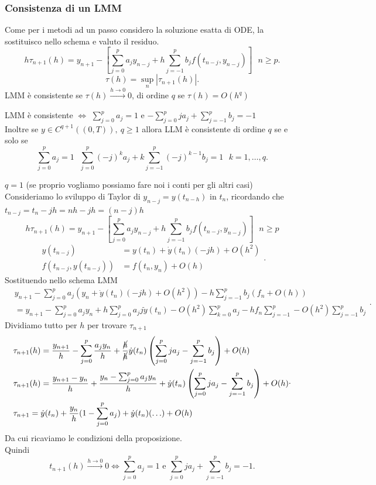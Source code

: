 \documentclass[12px]{article}
\begin{document}
\subsubsection{Consistenza di un LMM}
Come per i metodi ad un passo considero la soluzione esatta di ODE, la sostituisco nello schema e valuto il residuo.
\[
	h\tau_{n+1}(h) = y_{n+1} - \left[ \sum^{p}_{j=0}a_jy_{n-j} + h \sum^{p}_{j=-1}b_jf(t_{n-j},y_{n-j}) \right] \ \ \ n\geq p
.\] 
\[
	\tau(h) = \sup_{n} |\tau_{n+1}(h)|
.\] 
LMM è consistente se $\tau(h) \xrightarrow{h \rightarrow 0} 0$, di ordine $q$ se $\tau(h) = O(h^q)$\\
\begin{prop}
	LMM è consistente $ \Leftrightarrow$ $ \sum^{p}_{j=0}a_j = 1$ e $- \sum^{p}_{j=0}ja_j + \sum^{p}_{j=-1} b_j=-1$\\
	Inoltre se $y\in C^{q+1}((0,T)), \ q\geq 1$ allora LLM è consistente di ordine $q$ se e solo se
	\[
		\sum^{p}_{j=0}a_j = 1\ \ \ \sum^{p}_{j=0}(-j)^ka_j + k \sum^{p}_{j=-1}(-j)^{k-1}b_j=1\ \ \ k=1,\ldots,q
	.\] 
\end{prop}
\begin{dimo}
	$q=1$ (se proprio vogliamo possiamo fare noi i conti per gli altri casi)\\
	Consideriamo lo sviluppo di Taylor di $y_{n-j}=y(t_{n-h})$ in $t_n$, ricordando che  $t_{n-j} = t_n - jh = nh-jh = (n-j)h$
	\[
	h\tau_{n+1}(h) = y_{n+1} - \left[ \sum^{p}_{j=0}a_jy_{n-j} + h \sum^{p}_{j=-1}b_jf(t_{n-j},y_{n-j}) \right] \ \ \ n\geq p\]
	\[
		\begin{split}
			y(t_{n-j})&= y(t_n) + \dot y (t_n)(-jh) + O(h^2)\\
			f(t_{n-j}, y(t_{n-j})) &= f(t_n,y_n) + O(h)
		\end{split}
	.\] 
	Sostituendo nello schema LMM
	\[
		\begin{split}
		&y_{n+1} - \sum^{p}_{j=0}a_j(y_n + \dot y(t_n)(-jh)+O(h^2)) - h \sum^{p}_{j=-1}b_j (f_n + O(h))\\
		&= y_{n+1} - \sum^{p}_{j=0} a_jy_n + h \sum^{p}_{j=0}a_jj\dot y(t_n) - O(h^2) \sum^{p}_{k=0}a_j - hf_n \sum_{j=-1}^{p} - O(h^2) \sum^{p}_{j=-1}b_j
		\end{split}
	.\] 
	Dividiamo tutto per  $h$ per trovare $\tau_{n+1}$
	 \[
		 \begin{split}
		& \tau_{n+1}(h) = \frac{y_{n+1}} h- \sum^{p}_{j=0}\frac{a_jy_n} h + \frac {\cancel{h}}{\cancel{h}}\dot y(t_n) \left( \sum^{p}_{j=0}ja_j - \sum_{j=-1}^{p}b_j \right) + O(h)\\
		&\tau_{n+1}(h) = \frac{y_{n+1}-y_n}h + \frac{y_n - \sum^{p}_{j=0}a_jy_n}h + \dot y (t_n) \left( \sum^{p}_{j=0}ja_j- \sum^{p}_{j=-1}b_j  \right)+ O(h)\\
		&\tau_{n+1} = \dot y (t_n) + \frac {y_n}h(1 - \sum^{p}_{j=0}a_j) + \dot y (t_n) (\ldots ) + O(h)
		\end{split}
	.\] 
	Da cui ricaviamo le condizioni della proposizione.\\
	Quindi 
	\[
		t_{n+1} (h) \xrightarrow{h \rightarrow 0} 0 \Leftrightarrow \sum^{p}_{j=0}a_j = 1 \text { e } \sum^{p}_{j=0}ja_j + \sum^{p}_{j=-1}b_j = -1 
	.\] 
	
\end{dimo}
\end{document}

